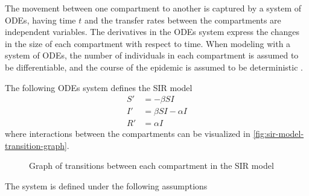 The movement between one compartment to another is captured by a system of \glspl{ODE}, having time $t$ and the transfer rates between the compartments are independent variables.
The derivatives in the \glspl{ODE} system express the changes in the size of each compartment with respect to time.
When modeling with a system of \glspl{ODE}, the number of individuals in each compartment is assumed to be differentiable, and the course of the epidemic is assumed to be deterministic \cite{brauerCompartmentalModelsEpidemiology2008}.

The following \glspl{ODE} system defines the \gls{SIR} model \cite{brauerCompartmentalModelsEpidemiology2008, kermackContributionMathematicalTheory1927}
\begin{equation}
    \begin{aligned}
        S' &= - \beta S I \\
        I' &= \beta S I - \alpha I \\
        R' &= \alpha I
    \end{aligned}
\end{equation}
where interactions between the compartments can be visualized in \autoref{fig:sir-model-transition-graph}.
\begin{figure}
    \centering
    \caption[SIR model transitions]{Graph of transitions between each compartment in the SIR model}
    \label{fig:sir-model-transition-graph}
\end{figure}
The system is defined under the following assumptions \cite{brauerCompartmentalModelsEpidemiology2008, kermackContributionMathematicalTheory1927}
